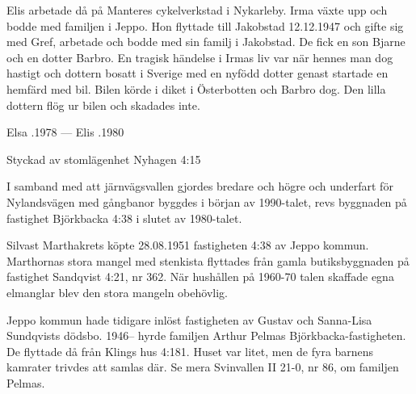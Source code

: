 Elis arbetade då på Manteres cykelverkstad i Nykarleby. Irma växte upp och bodde med familjen i Jeppo. Hon flyttade till Jakobstad 12.12.1947 och gifte sig med Gref, arbetade och bodde med sin familj i Jakobstad. De fick en son Bjarne och en dotter Barbro. En tragisk	händelse i Irmas liv var när hennes man dog hastigt och dottern	bosatt i Sverige med en nyfödd dotter genast startade en hemfärd med 	bil. Bilen körde i diket i Österbotten och Barbro dog. Den lilla dottern flög ur bilen och skadades inte.

Elsa .1978  ---  Elis .1980



%

Styckad av stomlägenhet Nyhagen 4:15

%
I samband med att järnvägsvallen gjordes bredare och högre och underfart för Nylandsvägen med gångbanor byggdes i början av 1990-talet, revs byggnaden på fastighet Björkbacka 4:38 i slutet av 1980-talet.


%
Silvast Marthakrets köpte 28.08.1951 fastigheten 4:38 av Jeppo kommun. Marthornas stora mangel med stenkista flyttades från gamla 	butiksbyggnaden på fastighet Sandqvist 4:21, nr 362. När hushållen på 1960-70 talen skaffade egna elmanglar blev den stora mangeln obehövlig.

Jeppo kommun hade tidigare inlöst fastigheten av Gustav och Sanna-Lisa Sundqvists dödsbo. 1946-- hyrde familjen Arthur Pelmas Björkbacka-fastigheten. De flyttade då från Klings hus 4:181. Huset var litet, men de fyra barnens kamrater trivdes att samlas där. Se mera Svinvallen II 21-0, nr 86, om familjen Pelmas.



